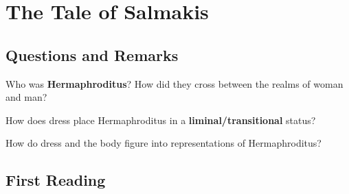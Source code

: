%
%
%
\chapter{The Tale of Salmakis}
\label{salm} %








\abstract{}

\section{Questions and Remarks}
\label{sec:QRHerm}

\begin{qst}
    Who was \textbf{Hermaphroditus}? How did they cross between the realms of woman and man?
\end{qst}


\begin{qst}
    How does dress place Hermaphroditus in a \textbf{liminal/transitional} status?
\end{qst}

\begin{qst}
    How do dress and the body figure into representations of Hermaphroditus?
\end{qst}



\section{First Reading}
\label{sec:FirReadHerm}


